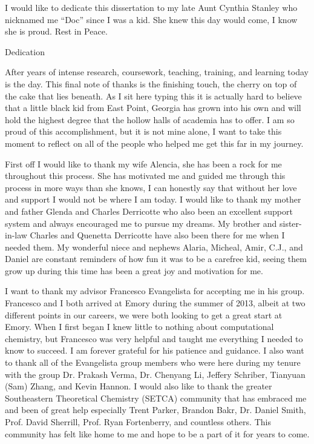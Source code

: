 \documentclass[final]{emory}
\begin{document}
\begin{acknowledgement}%
\epigraph{I would like to dedicate this dissertation to my late Aunt Cynthia Stanley who nicknamed me ``Doc'' since I was a kid. She knew this day would come, I know she is proud. Rest in Peace.}{Dedication}

After years of intense research, coursework, teaching, training, and learning today is the day. This final note of thanks is the finishing touch, the cherry on top of the cake that lies beneath. As I sit here typing this it is actually hard to believe that a little black kid from East Point, Georgia has grown into his own and will hold the highest degree that the hollow halls of academia has to offer. I am so proud of this accomplishment, but it is not mine alone, I want to take this moment to reflect on all of the people who helped me get this far in my journey.

First off I would like to thank my wife Alencia, she has been a rock for me throughout this process. She has motivated me and guided me through this process in more ways than she knows, I can honestly say that without her love and support I would not be where I am today. I would like to thank my mother and father Glenda and Charles Derricotte who also been an excellent support system and always encouraged me to pursue my dreams. My brother and sister-in-law Charles and Quenetta Derricotte have also been there for me when I needed them. My wonderful niece and nephews Alaria, Micheal, Amir, C.J., and Daniel are constant reminders of how fun it was to be a carefree kid, seeing them grow up during this time has been a great joy and motivation for me.

I want to thank my advisor Francesco Evangelista for accepting me in his group. Francesco and I both arrived at Emory during the summer of 2013, albeit at two different points in our careers, we were both looking to get a great start at Emory. When I first began I knew little to nothing about computational chemistry, but Francesco was very helpful and taught me everything I needed to know to succeed. I am forever grateful for his patience and guidance. I also want to thank all of the Evangelista group members who were here during my tenure with the group Dr. Prakash Verma, Dr. Chenyang Li, Jeffery Schriber, Tianyuan (Sam) Zhang, and Kevin Hannon. I would also like to thank the greater Southeastern Theoretical Chemistry (SETCA) community that has embraced me and been of great help especially Trent Parker, Brandon Bakr, Dr. Daniel Smith, Prof. David Sherrill, Prof. Ryan Fortenberry, and countless others. This community has felt like home to me and hope to be a part of it for years to come.
\end{acknowledgement}

\maketoc






%
%
\end{document}
